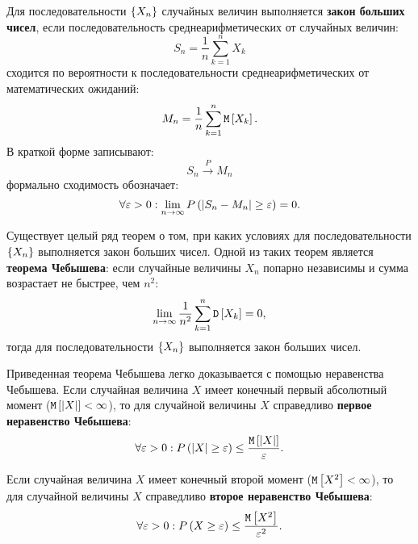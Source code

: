Для последовательности $\left \{ X_n \right \}$ случайных величин выполняется \textbf{закон больших чисел}, если последовательность среднеарифметических от случайных величин:
\begin{equation}
    S_n = \frac{1}{n} \sum_{k=1}^n X_k
\end{equation}
сходится по вероятности к последовательности среднеарифметических от математических ожиданий:
\begin{equation}
    M_n = \frac{1}{n} \sum_{k=1}^n \mathtt{M} \left [ X_k \right ] .
\end{equation}
В краткой форме записывают:
\begin{equation}
    S_n \stackrel{P}{\longrightarrow} M_n
\end{equation}
формально сходимость обозначает:
\begin{equation}
    \forall \varepsilon > 0: \lim_{n \rightarrow \infty} P \left (  \left |  S_n - M_n  \right | \ge \varepsilon  \right ) = 0 .
\end{equation}

Существует целый ряд теорем о том, при каких условиях для последовательности $\left \{ X_n \right \}$ выполняется закон больших чисел.
Одной из таких теорем является \textbf{теорема Чебышева}: если случайные величины $X_n$ попарно независимы и сумма возрастает не быстрее, чем $n^2$:
\begin{equation}
    \lim_{n \rightarrow \infty} \frac{1}{n^2} \sum_{k=1}^n \mathtt{D} \left [ X_k \right ] = 0 ,
\end{equation}
тогда для последовательности $\left \{ X_n \right \}$ выполняется закон больших чисел.

Приведенная теорема Чебышева легко доказывается с помощью неравенства Чебышева. Если случайная величина $X$ имеет конечный первый абсолютный момент
($\mathtt{M} \left [ \left | X \right | \right ] < \infty$), то для случайной величины $X$ справедливо \textbf{первое неравенство Чебышева}:
\begin{equation}
    \forall \varepsilon > 0 : P \left (  \left | X \right | \ge \varepsilon  \right ) \le \frac{\mathtt{M} \left [ \left | X \right | \right ]}{\varepsilon} .
\end{equation}

Если случайная величина $X$ имеет конечный второй момент ($\mathtt{M} \left [ X^2 \right ] < \infty$), то для случайной величины $X$ справедливо \textbf{второе неравенство Чебышева}:
\begin{equation}
    \forall \varepsilon > 0 : P \left (  X \ge \varepsilon  \right ) \le \frac{\mathtt{M} \left [ X^2 \right ]}{\varepsilon^2} .
\end{equation}

